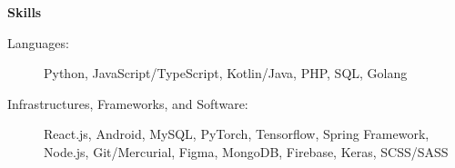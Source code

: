 \documentclass[letterpaper,11pt]{article}
\newcommand{\resheading}[1]{{\large \colorbox{mygrey}{\begin{minipage}{\textwidth}{\textbf{#1 \vphantom{p\^{E}}}}\end{minipage}}}}
\begin{document}

\resheading{Skills}

\begin{description}
\item[Languages:] Python, JavaScript/TypeScript, Kotlin/Java, PHP, SQL, Golang
\item[Infrastructures, Frameworks, and Software:] React.js, Android, MySQL, PyTorch, Tensorflow, Spring Framework, Node.js, Git/Mercurial, Figma, MongoDB, Firebase, Keras, SCSS/SASS
\end{description}
\end{document}
